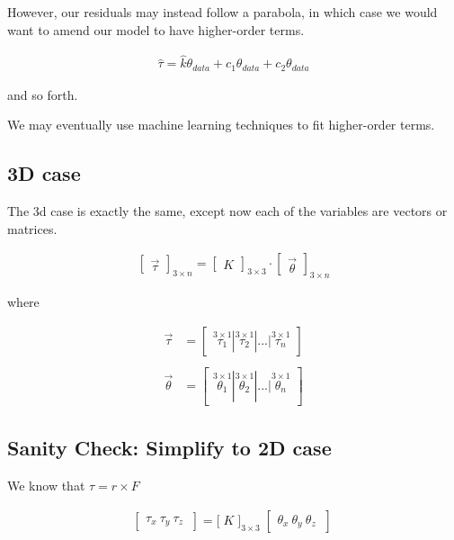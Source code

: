 \documentclass[preprint,12pt,3p]{elsarticle}
\begin{document}
However, our residuals may instead follow a parabola, in which case we would want to amend our model
to have higher-order terms.

\begin{align}
 \hat{\tau} = \hat{k}\theta_{data} +c_1 \theta_{data} + c_2 \theta_{data}
\end{align}

and so forth. 

We may eventually use machine learning techniques to fit higher-order terms.

\subsection{3D case}
The 3d case is exactly the same, except now each of the variables are vectors or matrices. 

\begin{align}
    \begin{bmatrix} \vec{\tau} \end{bmatrix}_{3\times n}  = \begin{bmatrix} K \end{bmatrix}_{3\times 3} \cdot \begin{bmatrix} \vec{\theta} \end{bmatrix}_{3\times n} 
\end{align}

where

\begin{align}
\vec{\tau} &= \begin{bmatrix} \stackrel{3\times 1}{\tau_1} | \stackrel{3\times 1}{\tau_2} | ... |\stackrel{3\times 1}{\tau_n} \end{bmatrix} \\
\\
\vec{\theta} &= \begin{bmatrix} \stackrel{3\times 1}{\theta_1} | \stackrel{3\times 1}{\theta_2} | ... |\stackrel{3\times 1}{\theta_n} \end{bmatrix}
\end{align}

\subsection{Sanity Check: Simplify to 2D case}

We know that $\tau = r \times F$

\begin{align}
    \begin{bmatrix}
        \tau_{x} \
        \tau_{y} \
        \tau_{z} \
    \end{bmatrix} =
    \Bigg[ \; K \; \Bigg]_{3\times3} \;
    \begin{bmatrix}
        \theta_{x} \
        \theta_{y} \
        \theta_{z} \
    \end{bmatrix} \
\end{align}
\end{document}
